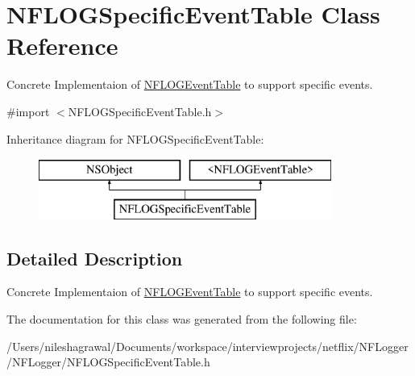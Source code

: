 \hypertarget{interface_n_f_l_o_g_specific_event_table}{}\section{N\+F\+L\+O\+G\+Specific\+Event\+Table Class Reference}
\label{interface_n_f_l_o_g_specific_event_table}


Concrete Implementaion of \hyperlink{class_n_f_l_o_g_event_table-p}{N\+F\+L\+O\+G\+Event\+Table} to support specific events.  




{\ttfamily \#import $<$N\+F\+L\+O\+G\+Specific\+Event\+Table.\+h$>$}

Inheritance diagram for N\+F\+L\+O\+G\+Specific\+Event\+Table\+:\begin{figure}[H]
\begin{center}
\leavevmode
\includegraphics[height=2.000000cm]{interface_n_f_l_o_g_specific_event_table}
\end{center}
\end{figure}


\subsection{Detailed Description}
Concrete Implementaion of \hyperlink{class_n_f_l_o_g_event_table-p}{N\+F\+L\+O\+G\+Event\+Table} to support specific events. 

The documentation for this class was generated from the following file\+:\begin{DoxyCompactItemize}
\item 
/\+Users/nileshagrawal/\+Documents/workspace/interviewprojects/netflix/\+N\+F\+Logger/\+N\+F\+Logger/N\+F\+L\+O\+G\+Specific\+Event\+Table.\+h\end{DoxyCompactItemize}
